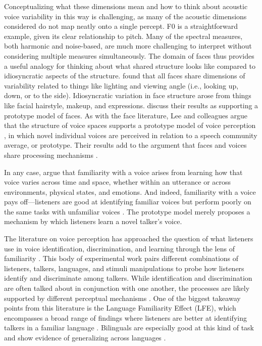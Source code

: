 Conceptualizing what these dimensions mean and how to think about acoustic voice variability in this way is challenging, as many of the acoustic dimensions considered do not map neatly onto a single percept. F0 is a straightforward example, given its clear relationship to pitch. Many of the spectral measures, both harmonic and noise-based, are much more challenging to interpret without considering multiple measures simultaneously. The domain of faces thus provides a useful analogy for thinking about what shared structure looks like compared to idiosyncratic aspects of the structure. \citet{burton_2016_faces} found that all faces share dimensions of variability related to things like lighting and viewing angle (i.e., looking up, down, or to the side). Idiosyncratic variation in face structure arose from things like facial hairstyle, makeup, and expressions. \citet{burton_2016_faces} discuss their results as supporting a prototype model of faces. As with the face literature, Lee and colleagues argue that the structure of voice spaces supports a prototype model of voice perception \citep{lavner_2001_prototype, latinus_2011_voice}, in which novel individual voices are perceived in relation to a speech community average, or prototype. Their results add to the argument that faces and voices share processing mechanisms \citep{yovel_2013_unified}.

In any case, \citet{lee_2019_acoustic} argue that familiarity with a voice arises from learning how that voice varies across time and space, whether within an utterance or across environments, physical states, and emotions. And indeed, familiarity with a voice pays off---listeners are good at identifying familiar voices but perform poorly on the same tasks with unfamiliar voices \citep{nygaard_1998_talker}. The prototype model merely proposes a mechanism by which listeners learn a novel talker's voice. 

The literature on voice perception has approached the question of what listeners use in voice identification, discrimination, and learning through the lens of familiarity \citep{levi_2019_methodological, perrachione_2018_recognizing}. This body of experimental work pairs different combinations of listeners, talkers, languages, and stimuli manipulations to probe how listeners identify and discriminate among talkers. While identification and discrimination are often talked about in conjunction with one another, the processes are likely supported by different perceptual mechanisms \citep{perrachione_2019_judgments}. One of the biggest takeaway points from this literature is the Language Familiarity Effect (LFE), which encompasses a broad range of findings where listeners are better at identifying talkers in a familiar language \citep[for a recent review, see][]{perrachione_2018_recognizing}. Bilinguals are especially good at this kind of task and show evidence of generalizing across languages \citep{orena_2019_identifying}. 


